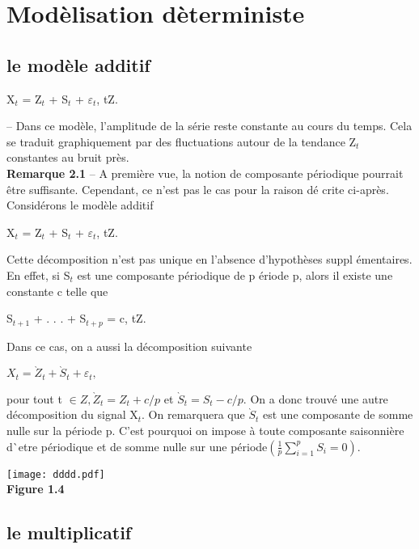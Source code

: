 \documentclass[a4paper,12pt,freqn]{report}
\theoremstyle{plain}
\begin{document}
\section{Mod\`{e}lisation d\`{e}terministe}
\subsection{ le mod\`{e}le additif}
X$_{t}$ = Z$_{t}$ + S$_{t}$ + $\varepsilon _{t}$, t\in Z.

-- Dans ce mod\`{e}le, l'amplitude de la s\'{e}rie reste constante au cours
du temps. Cela se traduit graphiquement par des fluctuations autour de la
tendance Z$_{t}$ constantes au bruit pr\`{e}s.\\
\textbf{Remarque 2.1 }
-- A premi\`{e}re vue, la notion de composante p\'{e}riodique pourrait
\^{e}tre suffisante. Cependant, ce n'est pas le cas pour la raison d\'{e}%
crite ci-apr\`{e}s. Consid\'{e}rons le mod\`{e}le additif

X$_{t}$ = Z$_{t}$ + S$_{t}$ + $\varepsilon _{t}$, t\in Z.

Cette d\'{e}composition n'est pas unique en l'absence d'hypoth\`{e}ses suppl%
\'{e}mentaires. En effet, si S$_{t}$ est une composante p\'{e}riodique de p%
\'{e}riode p, alors il existe une constante c telle que

S$_{t+1}$ + . . . + S$_{t+p}$ = c, t\in Z.

Dans ce cas, on a aussi la d\'{e}composition suivante

$X_{t} =  \grave{Z}_{t} + \grave{S}_{t}+ \varepsilon _{t},$

  pour tout t $\in Z, \grave{Z}_{t} = Z_{t}+ c/p$ et $\grave{S}_{t} = S_{t}-
c/p $. On a donc trouv\'{e} une autre d\'{e}composition du signal X$_{t}$. On
remarquera que $\grave{S}_{t}$ est une composante de somme nulle sur la p\'{e}riode
p. C'est pourquoi on impose \`{a} toute composante saisonni\`{e}re d\`{}etre p\'{e}riodique et de somme nulle sur une p\'{e}riode$(\frac{1}{p}\sum^{p}_{i=1}S_{i}=0)$.\\
 \begin{center}
  \texttt{[image: dddd.pdf]}\\
\textbf{Figure 1.4}
\end{center}



\subsection{le multiplicatif}
\end{document}

